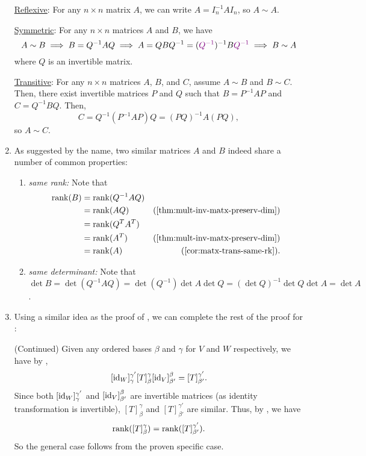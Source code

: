 \begin{enumerate}
\begin{pf}
\underline{Reflexive}: For any \(n\times n\) matrix \(A\), we can write
\(A=I_n^{-1}AI_n\), so \(A\sim A\).

\underline{Symmetric}: For any \(n\times n\) matrices \(A\) and \(B\), we have
\[
A\sim B
\implies B=Q^{-1}AQ
\implies A=QBQ^{-1}=({\color{violet}Q^{-1}})^{-1}B{\color{violet}Q^{-1}}
\implies B\sim A
\]
where \(Q\) is an invertible matrix.

\underline{Transitive}: For any \(n\times n\) matrices \(A\), \(B\), and \(C\),
assume \(A\sim B\) and \(B\sim C\). Then, there exist invertible matrices \(P\)
and \(Q\) such that \(B=P^{-1}AP\) and \(C=Q^{-1}BQ\). Then,
\[
C=Q^{-1}(P^{-1}AP)Q=(PQ)^{-1}A(PQ),
\]
so \(A\sim C\).
\end{pf}

\item As suggested by the name, two similar matrices \(A\) and \(B\) indeed
share a number of common properties:
\begin{enumerate}
\item \label{it:sim-matx-same-rk} \emph{same rank:} Note that
\begin{align*}
\rk{B}&=\rk{Q^{-1}AQ} \\
&=\rk{AQ}&\text{(\Cref{thm:mult-inv-matx-preserv-dim})} \\
&=\rk{Q^{T}A^{T}} \\
&=\rk{A^{T}}&\text{(\Cref{thm:mult-inv-matx-preserv-dim})} \\
&=\rk{A}&\text{(\Cref{cor:matx-trans-same-rk})}.
\end{align*}
\item \label{it:sim-matx-same-det} \emph{same determinant:} Note that \(\det
B=\det(Q^{-1}AQ)=\det(Q^{-1})\det A\det Q=(\det Q)^{-1}\det Q\det A=\det A\).
\end{enumerate}

\item \label{it:lt-rank-matx-pf-contd} Using a similar idea as the proof of
, we can complete the rest of the proof for
:

\begin{pf}
(Continued) Given any ordered bases \(\beta\) and \(\gamma\) for \(V\) and
\(W\) respectively, we have by ,
\[
[\operatorname{id}_{W}]_{\gamma}^{\gamma'}[T]_{\beta}^{\gamma}[\operatorname{id}_{V}]_{\beta'}^{\beta}
=[T]_{\beta'}^{\gamma'}.
\]
Since both \([\operatorname{id}_{W}]_{\gamma}^{\gamma'}\) and \([\operatorname{id}_{V}]_{\beta'}^{\beta}\)
are invertible matrices (as identity transformation is invertible),
\([T]_{\beta}^{\gamma}\) and \([T]_{\beta'}^{\gamma'}\) are similar. Thus, by
, we have
\[
\operatorname{rank}([T]_{\beta}^{\gamma})=\operatorname{rank}([T]_{\beta'}^{\gamma'}).
\]
So the general case follows from the proven specific case.
\end{pf}

\end{enumerate}

